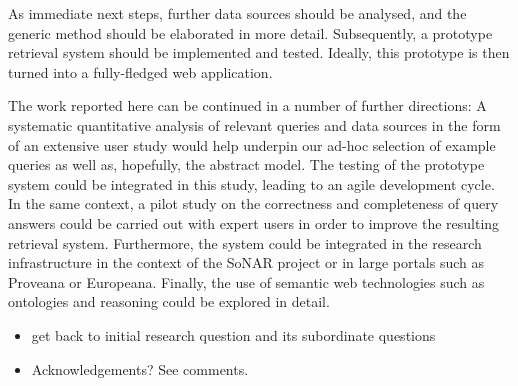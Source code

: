 As immediate next steps, further data sources should be analysed, and the generic method
should be elaborated in more detail. Subsequently, a prototype retrieval system should be implemented
and tested. Ideally, this prototype is then turned into a fully-fledged web application.

The work reported here can be continued in a number of further directions:
A systematic quantitative analysis of relevant queries and data sources
in the form of an extensive user study
would help underpin our ad-hoc selection of example queries
as well as, hopefully, the abstract model. 
The testing of the prototype system could be integrated in this study,
leading to an agile development cycle.
In the same context, a pilot study on the correctness and completeness of query answers
could be carried out with expert users in order to improve the resulting retrieval system.
Furthermore, the system could be integrated in the research infrastructure
in the context of the \gls{SoNAR} project or in large portals such as Proveana or Europeana.
Finally, the use of semantic web technologies such as ontologies and reasoning
could be explored in detail.




\begin{itemize}
  \item
    get back to initial research question and its subordinate questions
  \item
    Acknowledgements? See comments.
\end{itemize}

